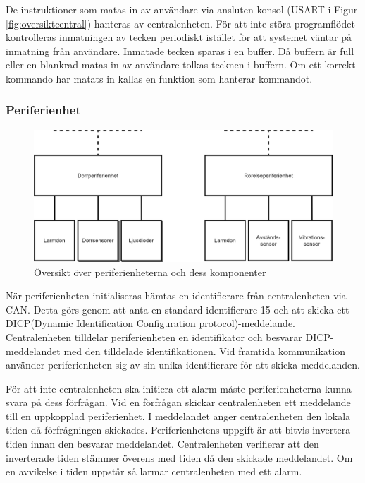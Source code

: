 \documentclass[a4paper]{article}
\begin{document}
De instruktioner som matas in av användare via ansluten konsol (USART i Figur \ref{fig:oversiktcentral}) hanteras av centralenheten.
För att inte störa programflödet kontrolleras inmatningen av tecken periodiskt istället för att systemet väntar på inmatning från användare.
Inmatade tecken sparas i en buffer.
Då buffern är full eller en blankrad matas in av användare tolkas tecknen i buffern.
Om ett korrekt kommando har matats in kallas en funktion som hanterar kommandot.


\subsubsection{Periferienhet}
\begin{figure}[H]
    \centering
    \includegraphics[width=\textwidth]{periferi-oversikt-pp.png}
    \caption{Översikt över periferienheterna och dess komponenter}
    \label{fig:oversiktperiferi}
\end{figure}

När periferienheten initialiseras hämtas en identifierare från centralenheten via CAN.
Detta görs genom att anta en standard-identifierare 15 och att skicka ett DICP(Dynamic Identification Configuration protocol)-meddelande.
Centralenheten tilldelar periferienheten en identifikator och besvarar DICP-meddelandet med den tilldelade identifikationen.
Vid framtida kommunikation använder periferienheten sig av sin unika identifierare för att skicka meddelanden.

För att inte centralenheten ska initiera ett alarm måste periferienheterna kunna svara på dess förfrågan.
Vid en förfrågan skickar centralenheten ett meddelande till en uppkopplad periferienhet.
I meddelandet anger centralenheten den lokala tiden då förfrågningen skickades.
Periferienhetens uppgift är att bitvis invertera tiden innan den besvarar meddelandet.
Centralenheten verifierar att den inverterade tiden stämmer överens med tiden då den skickade meddelandet.
Om en avvikelse i tiden uppstår så larmar centralenheten med ett alarm.
\end{document}
